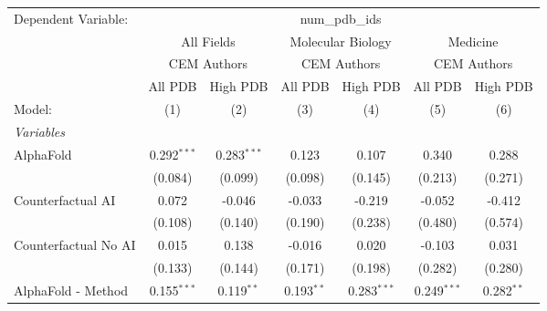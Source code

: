\begingroup
\centering
\begin{tabular}{lcccccc}
   \tabularnewline \midrule \midrule
   Dependent Variable: & \multicolumn{6}{c}{num\_pdb\_ids}\\
 & \multicolumn{2}{c}{All Fields} & \multicolumn{2}{c}{Molecular Biology} & \multicolumn{2}{c}{Medicine} \\
\cmidrule(lr){2-3} \cmidrule(lr){4-5} \cmidrule(lr){6-7}
 & \multicolumn{2}{c}{CEM Authors} & \multicolumn{2}{c}{CEM Authors} & \multicolumn{2}{c}{CEM Authors} \\
\cmidrule(lr){2-3} \cmidrule(lr){4-5} \cmidrule(lr){6-7}
 & \multicolumn{1}{c}{All PDB} & \multicolumn{1}{c}{High PDB} & \multicolumn{1}{c}{All PDB} & \multicolumn{1}{c}{High PDB} & \multicolumn{1}{c}{All PDB} & \multicolumn{1}{c}{High PDB} \\
\cmidrule(lr){2-2} \cmidrule(lr){3-3} \cmidrule(lr){4-4} \cmidrule(lr){5-5} \cmidrule(lr){6-6} \cmidrule(lr){7-7}
   Model:                                                     & (1)            & (2)            & (3)            & (4)            & (5)            & (6)\\  
   \midrule
   \emph{Variables}\\
   AlphaFold                                                  & 0.292$^{***}$  & 0.283$^{***}$  & 0.123          & 0.107          & 0.340          & 0.288\\   
                                                              & (0.084)        & (0.099)        & (0.098)        & (0.145)        & (0.213)        & (0.271)\\   
   Counterfactual AI                                          & 0.072          & -0.046         & -0.033         & -0.219         & -0.052         & -0.412\\   
                                                              & (0.108)        & (0.140)        & (0.190)        & (0.238)        & (0.480)        & (0.574)\\   
   Counterfactual No AI                                       & 0.015          & 0.138          & -0.016         & 0.020          & -0.103         & 0.031\\   
                                                              & (0.133)        & (0.144)        & (0.171)        & (0.198)        & (0.282)        & (0.280)\\   
   AlphaFold - Method                                         & 0.155$^{***}$  & 0.119$^{**}$   & 0.193$^{**}$   & 0.283$^{***}$  & 0.249$^{***}$  & 0.282$^{**}$\\   

\end{tabular}
